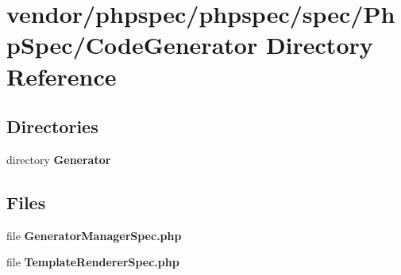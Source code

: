 \section{vendor/phpspec/phpspec/spec/\+Php\+Spec/\+Code\+Generator Directory Reference}
\label{dir_987d22b6c978f39cf3d68cdda5d4112f}
\subsection*{Directories}
\begin{DoxyCompactItemize}
\item 
directory {\bf Generator}
\end{DoxyCompactItemize}
\subsection*{Files}
\begin{DoxyCompactItemize}
\item 
file {\bf Generator\+Manager\+Spec.\+php}
\item 
file {\bf Template\+Renderer\+Spec.\+php}
\end{DoxyCompactItemize}

